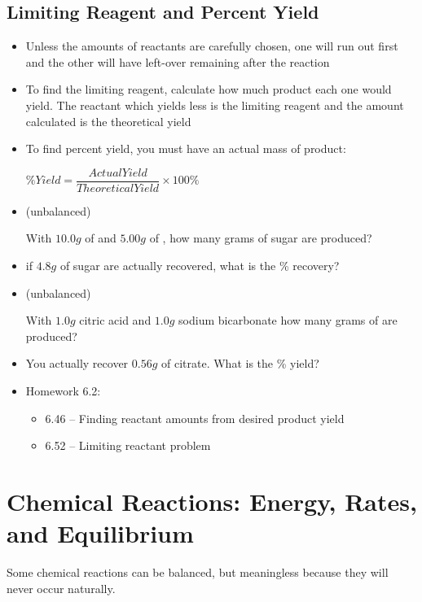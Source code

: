 \documentclass[12pt, openany, letterpaper]{memoir}
\begin{document}
\section{Limiting Reagent and Percent Yield}
\begin{itemize}
	\item Unless the amounts of reactants are carefully chosen, one will run out first and the other will have left-over remaining after the reaction
	\item To find the limiting reagent, calculate how much product each one would yield. The reactant which yields less is the limiting reagent and the amount calculated is the theoretical yield
	\item To find percent yield, you must have an actual mass of product:
	
	$\% Yield = \dfrac{Actual Yield}{Theoretical Yield}\times 100\%$
		\item {} (unbalanced)
	
	With $10.0g$ of  and $5.00g$ of , how many grams of sugar are produced?
	\item if $4.8g$ of sugar are actually recovered, what is the \% recovery?
	
	\item {} (unbalanced)
	
	With $1.0g$ citric acid and $1.0g$ sodium bicarbonate how many grams of  are produced?
	
	\item You actually recover $0.56g$ of citrate. What is the \% yield?
	\item Homework 6.2:
	\begin{itemize}
		\item 6.46 -- Finding reactant amounts from desired product yield 
		\item 6.52 -- Limiting reactant problem
	\end{itemize}
\end{itemize}

\chapter{Chemical Reactions: Energy, Rates, and Equilibrium}
Some chemical reactions can be balanced, but meaningless because they will never occur naturally.

\end{document}
